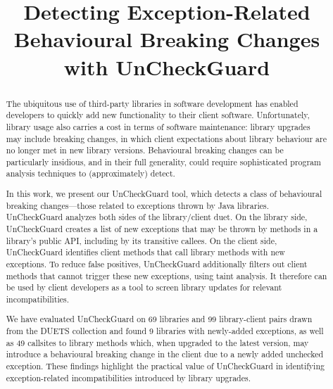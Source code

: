 \documentclass[conference]{IEEEtran}
\begin{document}
	\title {Detecting Exception-Related Behavioural Breaking Changes with UnCheckGuard}


    \maketitle
    \thispagestyle{plain}
    \pagestyle{plain}

    \begin{abstract}
      The ubiquitous use of third-party libraries in software development has enabled developers to quickly add
      new functionality to their client software. Unfortunately, library usage also carries a cost in
      terms of software maintenance: library upgrades may include breaking changes, in which client expectations
      about library behaviour are no longer met in new library versions. Behavioural breaking
      changes can be particularly insidious, and in their full generality, could require sophisticated program
      analysis techniques to (approximately) detect.

      In this work, we present our UnCheckGuard tool, which detects a class of behavioural breaking changes---those
      related to exceptions thrown by Java libraries. UnCheckGuard analyzes both sides of the library/client
      duet. On the library side, UnCheckGuard creates a list of new exceptions that may be thrown by methods
      in a library's public API, including by its transitive callees. On the client side, UnCheckGuard identifies
      client methods that call library methods with new exceptions. To reduce false positives, UnCheckGuard
      additionally filters out client methods that cannot trigger these new exceptions, using taint analysis. It therefore can be
      used by client developers as a tool to screen library updates for relevant incompatibilities.

      We have evaluated UnCheckGuard on 69 libraries and 99 library-client pairs drawn from the DUETS collection
      and found 9 libraries with newly-added exceptions, as well as 49 callsites to library methods which,
      when upgraded to the latest version, may introduce
      a behavioural breaking change in the client due to a newly added unchecked exception. These findings
      highlight the practical value of UnCheckGuard in identifying exception-related incompatibilities
      introduced by library upgrades.


    \end{abstract}
    
\end{document}
